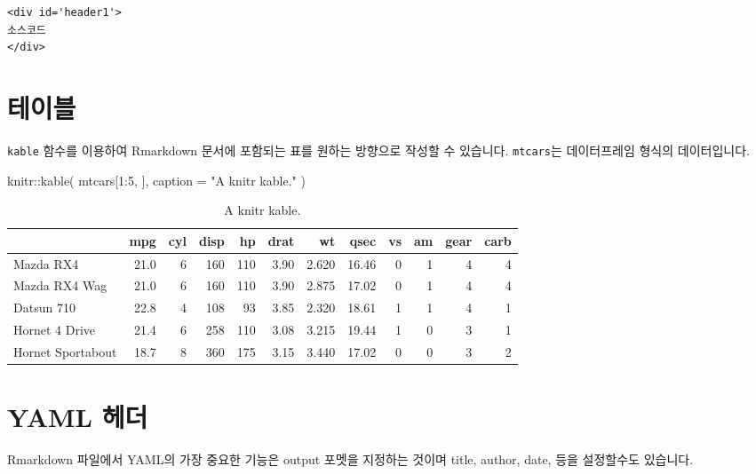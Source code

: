 \documentclass[
]{book}
\newenvironment{Shaded}{\begin{snugshade}}{\end{snugshade}}
\newcommand{\AttributeTok}[1]{\textcolor[rgb]{0.77,0.63,0.00}{#1}}
\newcommand{\DecValTok}[1]{\textcolor[rgb]{0.00,0.00,0.81}{#1}}
\newcommand{\FunctionTok}[1]{\textcolor[rgb]{0.00,0.00,0.00}{#1}}
\newcommand{\NormalTok}[1]{#1}
\newcommand{\SpecialCharTok}[1]{\textcolor[rgb]{0.00,0.00,0.00}{#1}}
\newcommand{\StringTok}[1]{\textcolor[rgb]{0.31,0.60,0.02}{#1}}
\begin{document}
\begin{verbatim}
<div id='header1'>
소스코드 
</div>
\end{verbatim}

\hypertarget{uxd14cuxc774uxbe14}{%
\section{테이블}\label{uxd14cuxc774uxbe14}}

\texttt{kable} 함수를 이용하여 Rmarkdown 문서에 포함되는 표를 원하는 방향으로 작성할 수 있습니다. \texttt{mtcars}는 데이터프레임 형식의 데이터입니다.

\begin{Shaded}
\begin{Highlighting}[]
\NormalTok{knitr}\SpecialCharTok{::}\FunctionTok{kable}\NormalTok{(}
\NormalTok{  mtcars[}\DecValTok{1}\SpecialCharTok{:}\DecValTok{5}\NormalTok{, ], }
  \AttributeTok{caption =} \StringTok{"A knitr kable."}
\NormalTok{)}
\end{Highlighting}
\end{Shaded}

\begin{table}

\caption{\label{tab:unnamed-chunk-8}A knitr kable.}
\centering
\begin{tabular}[t]{l|r|r|r|r|r|r|r|r|r|r|r}
\hline
  & mpg & cyl & disp & hp & drat & wt & qsec & vs & am & gear & carb\\
\hline
Mazda RX4 & 21.0 & 6 & 160 & 110 & 3.90 & 2.620 & 16.46 & 0 & 1 & 4 & 4\\
\hline
Mazda RX4 Wag & 21.0 & 6 & 160 & 110 & 3.90 & 2.875 & 17.02 & 0 & 1 & 4 & 4\\
\hline
Datsun 710 & 22.8 & 4 & 108 & 93 & 3.85 & 2.320 & 18.61 & 1 & 1 & 4 & 1\\
\hline
Hornet 4 Drive & 21.4 & 6 & 258 & 110 & 3.08 & 3.215 & 19.44 & 1 & 0 & 3 & 1\\
\hline
Hornet Sportabout & 18.7 & 8 & 360 & 175 & 3.15 & 3.440 & 17.02 & 0 & 0 & 3 & 2\\
\hline
\end{tabular}
\end{table}

\hypertarget{yaml-uxd5e4uxb354}{%
\section{YAML 헤더}\label{yaml-uxd5e4uxb354}}

Rmarkdown 파일에서 YAML의 가장 중요한 기능은 output 포멧을 지정하는 것이며 title, author, date, 등을 설정할수도 있습니다.
\end{document}
